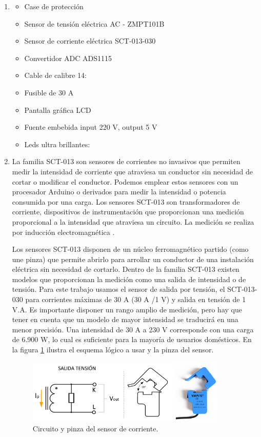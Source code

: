 \begin{enumerate}
\item {}
\begin{itemize}
\item Case de protección
\item Sensor de tensión eléctrica AC - ZMPT101B
\item Sensor de corriente eléctrica SCT-013-030
\item Convertidor ADC ADS1115
\item Cable de calibre 14:
\item Fusible de 30 A
\item Pantalla gráfica LCD
\item Fuente embebida input 220 V, output 5 V
\item Leds ultra brillantes:
\end{itemize}
\item  {}

La familia SCT-013 son sensores de corrientes no invasivos que permiten medir la intensidad de corriente que atraviesa un conductor sin necesidad de cortar o modificar el conductor. Podemos emplear estos sensores con un procesador Arduino o derivados para medir la intensidad o potencia consumida por una carga. Los sensores SCT-013 son transformadores de corriente, dispositivos de instrumentación que proporcionan una medición proporcional a la intensidad que atraviesa un circuito. La medición se realiza por inducción electromagnética \citep{WEBSITE:9}.

Los sensores SCT-013 disponen de un núcleo ferromagnético partido (como une pinza) que permite abrirlo para arrollar un conductor de una instalación eléctrica sin necesidad de cortarlo. Dentro de la familia SCT-013 existen modelos que proporcionan la medición como una salida de intensidad o de tensión. Para este trabajo usamos el sensor de salida por tensión, el SCT-013-030 para corrientes máximas de 30 A (30 A /1 V) y salida en tensión de 1 V.A. Es importante disponer un rango amplio de medición, pero hay que tener en cuenta que un modelo de mayor intensidad se traducirá en una menor precisión. Una intensidad de 30 A a 230 V corresponde con una carga de 6.900 W, lo cual es suficiente para la mayoría de usuarios domésticos. En la figura \ref{fig:consumo1} ilustra el esquema lógico a usar y la pinza del sensor.

\begin{figure}[htpb]
\centering 
\includegraphics[width=0.9\textwidth]{./Figures/consumo1.png}
\caption{Circuito y pinza del sensor de corriente. }
\label{fig:consumo1}
\end{figure}


\end{enumerate}
